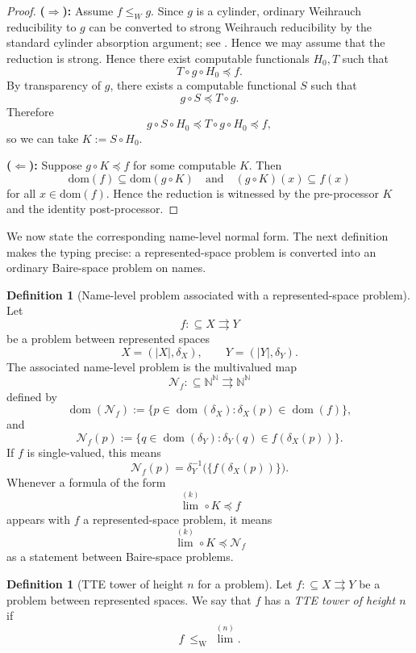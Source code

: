 \documentclass{lmcs} %
\theoremstyle{plain}
\theoremstyle{plain}
\theoremstyle{definition}
\newtheorem{definition}[theorem]{Definition}
\theoremstyle{remark}
\theoremstyle{definition}
\theoremstyle{remark}
\numberwithin{equation}{section}
\newcommand{\dom}{\mathrm{dom}}
\newcommand{\Lim}{\operatorname{lim}}
\newcommand{\Limi}[1]{\Lim^{(#1)}}
\begin{document}
\begin{proof}
\textbf{($\Rightarrow$):}
Assume $f \leq_W g$. Since \(g\) is a cylinder, ordinary Weihrauch reducibility to \(g\) can be converted
to strong Weihrauch reducibility by the standard cylinder absorption argument; see \cite{brattka2021weihrauch}. Hence we may assume that the reduction is strong. Hence there exist
computable functionals $H_0,T$ such that
\[
T \circ g \circ H_0 \preceq f .
\]
By transparency of $g$, there exists a computable functional $S$ such that
\[
g \circ S \preceq T \circ g .
\]
Therefore
\[
g \circ S \circ H_0 \preceq T \circ g \circ H_0 \preceq f ,
\]
so we can take $K := S \circ H_0$.

\textbf{($\Leftarrow$):}
Suppose $g \circ K \preceq f$ for some computable $K$. Then
\[
\dom(f) \subseteq \dom(g \circ K)
\quad\text{and}\quad
(g \circ K)(x) \subseteq f(x)
\]
for all $x \in \dom(f)$. Hence the reduction is witnessed by the pre-processor $K$ and
the identity post-processor.
\end{proof}

We now state the corresponding name-level normal form. The next definition makes the typing precise: a represented-space problem is converted into an ordinary Baire-space
problem on names.

\begin{definition}[Name-level problem associated with a represented-space problem]\label{def:name-level-problem}
Let
\[
        f:\subseteq X\rightrightarrows Y
\]
be a problem between represented spaces
\[
        X=(|X|,\delta_X),\qquad Y=(|Y|,\delta_Y).
\]
The associated name-level problem is the multivalued map
\[
        \mathcal N_f:\subseteq\mathbb N^{\mathbb N}\rightrightarrows
        \mathbb N^{\mathbb N}
\]
defined by
\[
        \operatorname{dom}(\mathcal N_f) :=
        \{p\in\operatorname{dom}(\delta_X):
        \delta_X(p)\in\operatorname{dom}(f)\},
\]
and
\[
        \mathcal N_f(p) :=
        \{q\in\operatorname{dom}(\delta_Y):
        \delta_Y(q)\in f(\delta_X(p))\}.
\]
If \(f\) is single-valued, this means
\[
        \mathcal N_f(p)=
        \delta_Y^{-1}\bigl(\{f(\delta_X(p))\}\bigr).
\]
Whenever a formula of the form
\[
        \Limi{k} \circ K\preceq f
\]
appears with \(f\) a represented-space problem, it means
\[
        \Limi{k} \circ K\preceq \mathcal N_f
\]
as a statement between Baire-space problems.
\end{definition}

\begin{definition}[TTE tower of height $n$ for a problem]
Let $f:\subseteq X\rightrightarrows Y$ be a problem between represented spaces.
We say that $f$ has a \textit{TTE tower of height $n$} if
\[
f\ \le_{\mathrm W}\ \Limi{n}.
\]
\end{definition}
\end{document}
